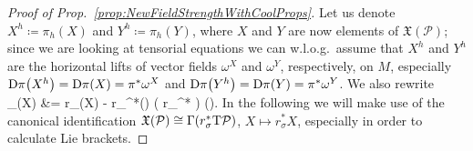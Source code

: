 \documentclass[a4paper,oneside,11pt,bibliography=totoc]{scrartcl}
\makeatletter
\def\oversortoftilde#1{\mathop{\vbox{\m@th\ialign{##\crcr\noalign{\kern3\p@}%
      \sortoftildefill\crcr\noalign{\kern3\p@\nointerlineskip}%
      $\hfil\displaystyle{#1}\hfil$\crcr}}}\limits}
\def\sortoftildefill{$\m@th \setbox\z@\hbox{$\braceld$}%
  \braceld\leaders\vrule \@height\ht\z@ \@depth\z@\hfill\braceru$}
\def\bas#1\eas{\begin{align*}#1\end{align*}}
\theoremstyle{plain}
\theoremstyle{remark}
\theoremstyle{definition}
\makeatother
\begin{document}
\begin{proof}[Proof of Prop.\ \ref{prop:NewFieldStrengthWithCoolProps}]
\eas
Let us denote $X^h \coloneqq \pi_h(X)$ and $Y^h \coloneqq \pi_h(Y)$, where $X$ and $Y$ are now elements of $\mathfrak{X}(\mathcal{P})$; since we are looking at tensorial equations we can w.l.o.g.\ assume that $X^h$ and $Y^h$ are the horizontal lifts of vector fields $\omega^X$ and $\omega^Y$, respectively, on $M$, especially $\mathrm{D}\pi\mleft( X^h \mright) = \mathrm{D}\pi\mleft( X \mright) = \pi^*\omega^X$ and $\mathrm{D}\pi\mleft( Y^h \mright) = \mathrm{D}\pi\mleft( Y \mright) = \pi^*\omega^Y$.
We also rewrite
\bas
\mathcal{r}_{\sigma*}(X)
&=
r_{\sigma}(X)
	- r_{\sigma}^*\mleft({\oversortoftilde{ \mleft(\pi^! \Delta \sigma \mright) (X)}}\mright)
\in
\Gamma\mleft( r_\sigma^*  \mright) \cong {}().
\eas
In the following we will make use of the canonical identification $\mathfrak{X}(\mathcal{P}) \cong \Gamma\mleft( r_\sigma^* \mathrm{T}\mathcal{P} \mright)$, $X \mapsto r_\sigma^*X$, especially in order to calculate Lie brackets.
%


\end{proof}
\end{document}
